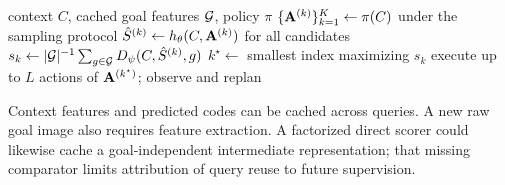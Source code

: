 \begin{algorithm}[t]
\caption{CTA deployment at one decision}
\label{alg:cta}
\small
\begin{algorithmic}[1]
\Require context $C$, cached goal features $\mathcal{G}$, policy $\pi$
\State $\{\mathbf{A}^{(k)}\}_{k=1}^K\gets\pi(C)$ under the sampling protocol
\State $\hat S^{(k)}\gets h_\theta(C,\mathbf{A}^{(k)})$ for all candidates
\State $s_k\gets |\mathcal{G}|^{-1}\sum_{g\in\mathcal{G}}D_\psi(C,\hat S^{(k)},g)$
\State $k^\star\gets$ smallest index maximizing $s_k$
\State execute up to $L$ actions of $\mathbf{A}^{(k^\star)}$; observe and replan
\end{algorithmic}
\end{algorithm}
Context features and predicted codes can be cached across queries. A new raw goal image also requires feature extraction. A factorized direct scorer could likewise cache a goal-independent intermediate representation; that missing comparator limits attribution of query reuse to future supervision.
